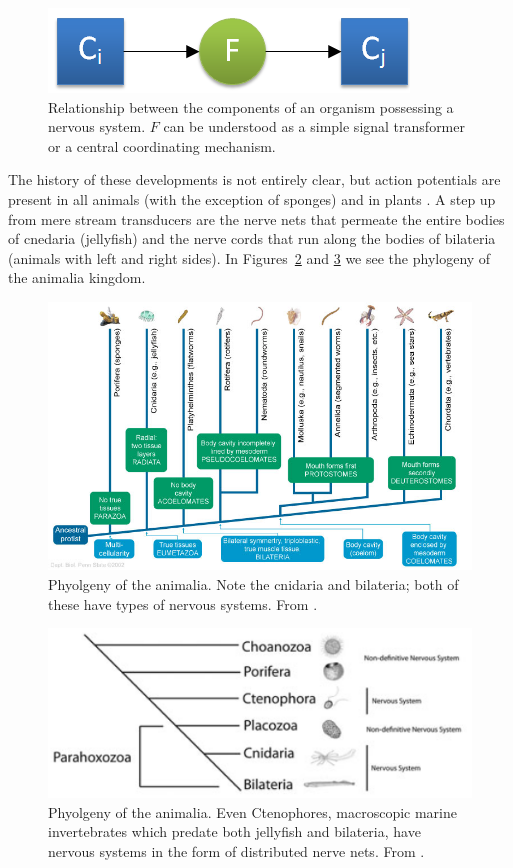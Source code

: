 \begin{figure}
	\centering
	\includegraphics{figs/nervousSystem.png}
	\caption{Relationship between the components of an organism possessing a nervous system. $F$ can be understood as a simple signal transformer or a central coordinating mechanism.}
	\label{fig:nervousSystem}
\end{figure}

The history of these developments is not entirely clear, but action potentials are present in all animals (with the exception of sponges) and in plants \cite{Leys01051999, PCE:PCE1614}. 
A step up from mere stream transducers are the nerve nets that permeate the entire bodies of cnedaria (jellyfish) and the nerve cords that run along the bodies of bilateria (animals with left and right sides). In Figures~\ref{fig:animalia} and \ref{fig:animalia2} we see the phylogeny of the animalia kingdom.

\begin{figure}
	\centering
	\includegraphics[width=\textwidth]{Figs/animalia.jpg}
	\caption{Phyolgeny of the animalia. Note the cnidaria and bilateria; both of these have types of nervous systems. From \cite{animalia}.}
	\label{fig:animalia}
\end{figure}

\begin{figure}
	\centering
	\includegraphics[width=\textwidth]{Figs/animalia2.png}
	\caption{Phyolgeny of the animalia. Even Ctenophores, macroscopic marine invertebrates which predate both jellyfish and bilateria, have nervous systems in the form of distributed nerve nets. From \cite{animalia2}.}
	\label{fig:animalia2}
\end{figure}

